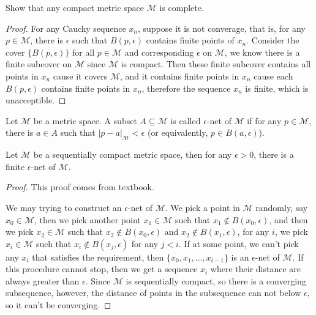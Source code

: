 \documentclass[./main.tex]{subfiles}
\begin{document}
\begin{theorem}
  Show that any compact metric space $\mathcal{M}$ is complete.
\end{theorem}
\begin{proof}
  For any Cauchy sequence $x_n$, suppose it is not converage, that is, for any
  $p \in \mathcal{M}$, there is $\epsilon$ such that $B(p, \epsilon)$ contains
  finite points of $x_n$. Consider the cover $\{ B(p, \epsilon) \}$ for all $p \in \mathcal{M}$
  and corresponding $\epsilon$ on $\mathcal{M}$, we know there is a finite subcover on
  $\mathcal{M}$ since $\mathcal{M}$ is compact. Then these finite subcover contains
  all points in $x_n$ cause it covers $\mathcal{M}$, and it contains finite points in $x_n$
  cause each $B(p, \epsilon)$ contains finite points in $x_n$, therefore the sequence $x_n$ 
  is finite, which is unacceptible.
\end{proof}

\begin{definition}
  Let $\mathcal{M}$ be a metric space. A subset $A \subseteq \mathcal{M}$
  is called $\epsilon$-net of $\mathcal{M}$ if for any $p \in \mathcal{M}$,
  there is $a \in A$ such that $|p - a|_\mathcal{M} < \epsilon$ 
  (or equivalently, $p \in B(a, \epsilon)$).
\end{definition}

\begin{theorem}
  Let $\mathcal{M}$ be a sequentially compact metric space, then for any $\epsilon > 0$,
  there is a finite $\epsilon$-net of $\mathcal{M}$.
\end{theorem}
\begin{proof}
  This proof comes from textbook.\par
  We may trying to construct an $\epsilon$-net of $\mathcal{M}$.
  We pick a point in $\mathcal{M}$ randomly, say $x_0 \in \mathcal{M}$,
  then we pick another point $x_1 \in \mathcal{M}$ such that $x_1 \notin B(x_0, \epsilon)$,
  and then we pick $x_2 \in \mathcal{M}$ such that $x_2 \notin B(x_0, \epsilon)$ and $x_2 \notin B(x_1, \epsilon)$,
  for any $i$, we pick $x_i \in \mathcal{M}$ such that $x_i \notin B(x_j, \epsilon)$ for any $j < i$.
  If at some point, we can't pick any $x_i$ that satisfies the requirement, then
  $\{ x_0, x_1, \dots, x_{i - 1} \}$ is an $\epsilon$-net of $\mathcal{M}$.
  If this procedure cannot stop, then we get a sequence $x_i$ where their
  distance are always greater than $\epsilon$. Since $\mathcal{M}$ is sequentially compact,
  so there is a converging subsequence, however, the distance of points in the subsequence 
  can not below $\epsilon$, so it can't be converging.
\end{proof}
\end{document}
